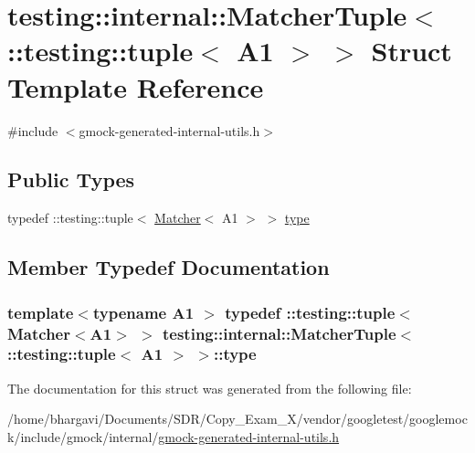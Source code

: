 \hypertarget{structtesting_1_1internal_1_1_matcher_tuple_3_01_1_1testing_1_1tuple_3_01_a1_01_4_01_4}{}\section{testing\+:\+:internal\+:\+:Matcher\+Tuple$<$ \+:\+:testing\+:\+:tuple$<$ A1 $>$ $>$ Struct Template Reference}
\label{structtesting_1_1internal_1_1_matcher_tuple_3_01_1_1testing_1_1tuple_3_01_a1_01_4_01_4}


{\ttfamily \#include $<$gmock-\/generated-\/internal-\/utils.\+h$>$}

\subsection*{Public Types}
\begin{DoxyCompactItemize}
\item 
typedef \+::testing\+::tuple$<$ \hyperlink{classtesting_1_1_matcher}{Matcher}$<$ A1 $>$ $>$ \hyperlink{structtesting_1_1internal_1_1_matcher_tuple_3_01_1_1testing_1_1tuple_3_01_a1_01_4_01_4_a8463ac100366f7e8b6ad1035e42ec4b0}{type}
\end{DoxyCompactItemize}


\subsection{Member Typedef Documentation}
\subsubsection[{\texorpdfstring{type}{type}}]{\setlength{\rightskip}{0pt plus 5cm}template$<$typename A1 $>$ typedef \+::testing\+::tuple$<${\bf Matcher}$<$A1$>$ $>$ {\bf testing\+::internal\+::\+Matcher\+Tuple}$<$ \+::testing\+::tuple$<$ A1 $>$ $>$\+::{\bf type}}\hypertarget{structtesting_1_1internal_1_1_matcher_tuple_3_01_1_1testing_1_1tuple_3_01_a1_01_4_01_4_a8463ac100366f7e8b6ad1035e42ec4b0}{}\label{structtesting_1_1internal_1_1_matcher_tuple_3_01_1_1testing_1_1tuple_3_01_a1_01_4_01_4_a8463ac100366f7e8b6ad1035e42ec4b0}


The documentation for this struct was generated from the following file\+:\begin{DoxyCompactItemize}
\item 
/home/bhargavi/\+Documents/\+S\+D\+R/\+Copy\+\_\+\+Exam\+\_\+X/vendor/googletest/googlemock/include/gmock/internal/\hyperlink{gmock-generated-internal-utils_8h}{gmock-\/generated-\/internal-\/utils.\+h}\end{DoxyCompactItemize}
